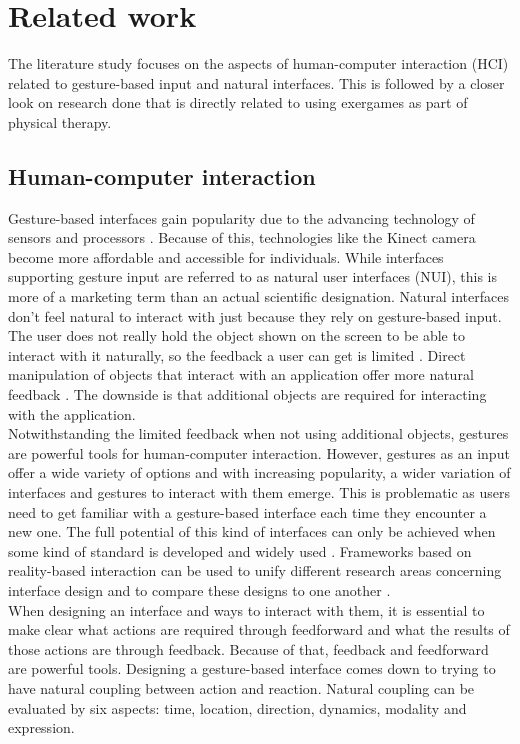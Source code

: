 \chapter{Related work}
\label{chapter: related work}

The literature study focuses on the aspects of human-computer interaction (HCI) related to gesture-based input and natural interfaces. This is followed by a closer look on research done that is directly related to using exergames as part of physical therapy.

\section{Human-computer interaction}


Gesture-based interfaces gain popularity due to the advancing technology of sensors and processors \cite{Jacob2008}. Because of this, technologies like the Kinect camera become more affordable and accessible for individuals. While interfaces supporting gesture input are referred to as natural user interfaces (NUI), this is more of a marketing term than an actual scientific designation. Natural interfaces don't feel natural to interact with just because they rely on gesture-based input. The user does not really hold the object shown on the screen to be able to interact with it naturally, so the feedback a user can get is limited \cite{Norman2010}. Direct manipulation of objects that interact with an application offer more natural feedback \cite{Shneiderman2010}. The downside is that additional objects are required for interacting with the application.\\

Notwithstanding the limited feedback when not using additional objects, gestures are powerful tools for human-computer interaction. However, gestures as an input offer a wide variety of options and with increasing popularity, a wider variation of interfaces and gestures to interact with them emerge. This is problematic as users need to get familiar with a gesture-based interface each time they encounter a new one. The full potential of this kind of interfaces can only be achieved when some kind of standard is developed and widely used \cite{Norman2010}. Frameworks based on reality-based interaction can be used to unify different research areas concerning interface design and to compare these designs to one another \cite{Jacob2008}.\\

When designing an interface and ways to interact with them, it is essential to make clear what actions are required through feedforward and what the results of those actions are through feedback. Because of that, feedback and feedforward are powerful tools. Designing a gesture-based interface comes down to trying to have natural coupling between action and reaction. Natural coupling can be evaluated by six aspects: time, location, direction, dynamics, modality and expression.\cite{Wensveen2004}\\


